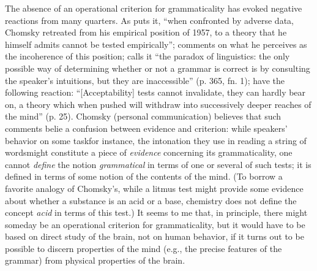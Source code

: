 The absence of an operational criterion for grammaticality has evoked negative reactions from many quarters.  As \citet{Reich1969} puts it, ``when confronted by adverse data, Chomsky retreated from his empirical position of 1957, to a theory that he himself admits cannot be tested empirically''; \citet{Marks1967} comments on what he perceives as the incoherence of this position; \citet{Householder1973} calls it ``the paradox of linguistics: the only possible way of determining whether or not a grammar is correct is by consulting the speaker's intuitions, but they are inaccessible'' (p. 365, fn. 1); \citet{GleitmanEtAl1970} have the following reaction: ``[Acceptability] tests cannot invalidate, they can hardly bear on, a theory which when pushed will withdraw into successively deeper reaches of the mind'' (p. 25). Chomsky (personal communication) believes that such comments belie a confusion between evidence and criterion: while speakers' behavior on some task\schdash{}for instance, the intonation they use in reading a string of words\schdash{}might constitute a piece of \textit{evidence} concerning its grammaticality, one cannot \textit{define} the notion \textit{grammatical} in terms of one or several of such tests; it is defined in terms of some notion of the contents of the mind. (To borrow a favorite analogy of Chomsky's, while a litmus test might provide some evidence about whether a substance is an acid or a base, chemistry does not define the concept \textit{acid} in terms of this test.) It seems to me that, in principle, there might someday be an operational criterion for grammaticality, but it would have to be based on direct study of the brain, not on human behavior, if it turns out to be possible to discern properties of the mind (e.g., the precise features of the grammar) from physical properties of the brain.

